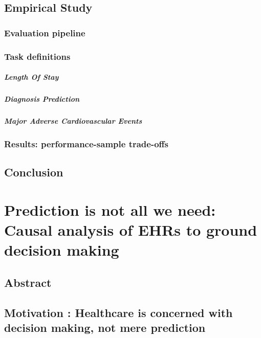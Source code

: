 \documentclass{report}
\begin{document}
\section{Empirical Study}\label{sec:predictive_models:empirical_study}
\subsection{Evaluation pipeline}\label{subsec:predictive_models:evaluation_pipeline}
\subsection{Task definitions}\label{subsec:predictive_models:task_definitions}

\paragraph{Length Of Stay}
\paragraph{Diagnosis Prediction}
\paragraph{Major Adverse Cardiovascular Events}
\subsection{Results: performance-sample trade-offs}

\section{Conclusion}\label{sec:predictive_models:conclusion}

\chapter{Prediction is not all we need: Causal analysis of EHRs to ground decision making}\label{chapter:causal_tuto}
\section{Abstract}\label{sec:causal_tuto:abstract}

\section{Motivation : Healthcare is concerned with decision making, not mere prediction}\label{sec:causal_tuto:motivation}
\end{document}
